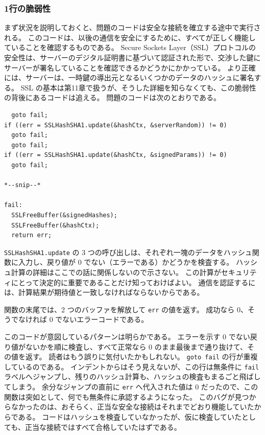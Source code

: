 \documentclass[uplatex]{jsarticle}
\def\label#1{}%
\begin{document}
\subsubsection{1行の脆弱性}

まず状況を説明しておくと、問題のコードは安全な接続を確立する途中で実行される。
このコードは、以後の通信を安全にするために、すべてが正しく機能していることを確認するものである。
Secure Sockets Layer（SSL）プロトコルの安全性は、サーバーのデジタル証明書に基づいて認証された形で、交渉した鍵にサーバーが署名していることを確認できるかどうかにかかっている。
より正確には、サーバーは、一時鍵の導出元となるいくつかのデータのハッシュに署名する。
SSL の基本は第11章で扱うが、そうした詳細を知らなくても、この脆弱性の背後にあるコードは追える。
問題のコードは次のとおりである。

\begin{exa}\label{exa:ch8-gotofail-code}
\begin{verbatim}
  goto fail;
if ((err = SSLHashSHA1.update(&hashCtx, &serverRandom)) != 0)
  goto fail;
  goto fail;
if ((err = SSLHashSHA1.update(&hashCtx, &signedParams)) != 0)
  goto fail;

*--snip--*

fail:
  SSLFreeBuffer(&signedHashes);
  SSLFreeBuffer(&hashCtx);
  return err;
\end{verbatim}
\end{exa}

\texttt{SSLHashSHA1.update} の 3 つの呼び出しは、それぞれ一塊のデータをハッシュ関数に入力し、戻り値が 0 でない（エラーである）かどうかを検査する。
ハッシュ計算の詳細はここでの話に関係しないので示さない。
この計算がセキュリティにとって決定的に重要であることだけ知っておけばよい。
通信を認証するには、計算結果が期待値と一致しなければならないからである。

関数の末尾では、2 つのバッファを解放して \texttt{err} の値を返す。
成功なら 0、そうでなければ 0 でないエラーコードである。

このコードが意図しているパターンは明らかである。
エラーを示す 0 でない戻り値がないかを順に検査し、すべて正常なら 0 のまま最後まで通り抜けて、その値を返す。
読者はもう誤りに気付いたかもしれない。
\texttt{goto fail} の行が重複しているのである。
インデントからはそう見えないが、この行は無条件に \texttt{fail} ラベルへジャンプし、残りのハッシュ計算も、ハッシュの検査もまるごと飛ばしてしまう。
余分なジャンプの直前に \texttt{err} へ代入された値は 0 だったので、この関数は突如として、何でも無条件に承認するようになった。
このバグが見つからなかったのは、おそらく、正当な安全な接続はそれまでどおり機能していたからである。
コードはハッシュを検査していなかったが、仮に検査していたとしても、正当な接続ではすべて合格していたはずである。
\end{document}
